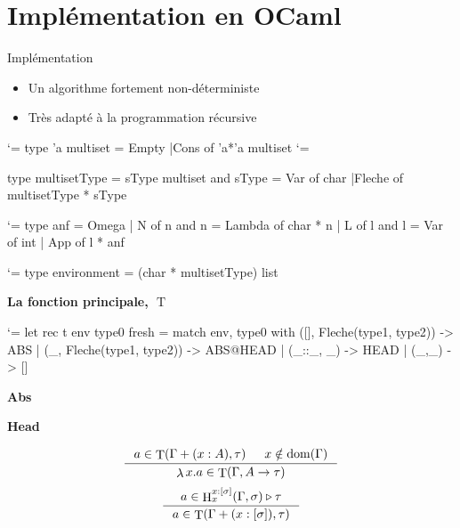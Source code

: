 \documentclass{beamer}
\newcommand\heading[1]{%
  \par\bigskip
  {\Large\bfseries#1}\par\smallskip}
\let\origlstlisting=\lstlisting
\let\endoriglstlisting=\endlstlisting
\renewenvironment{lstlisting}
{\mathcode`\-=\hyphenmathcode
    \everymath{}\mathsurround=0pt\origlstlisting}
{\endoriglstlisting}
\DeclareMathOperator{\iT}{T}
\DeclareMathOperator{\iH}{H}
\DeclareMathOperator{\iDom}{dom}
\DeclareMathOperator{\iLambda}{\lambda}
\begin{document}
    \section{Implémentation en OCaml}
    \begin{frame}[containsverbatim]{Implémentation}
        \begin{itemize}
            \item Un algorithme fortement non-déterministe
            \item Très adapté à la programmation récursive
        \end{itemize}
        
        \begin{multicols}{2}
        \begin{lstlisting}
type 'a multiset =
 Empty
|Cons of 'a*'a multiset
        \end{lstlisting}
\begin{lstlisting} %[caption={Intersection types and environments}]

type multisetType = 
 sType multiset 
and sType = 
 Var of char
|Fleche of multisetType
            * sType
\end{lstlisting}

        \vfill
        \columnbreak
        \begin{lstlisting}
type anf = 
    Omega
  | N of n
and n = 
    Lambda of char * n
  | L of l
and l =
    Var of int
  | App of l * anf
            \end{lstlisting}
            
        \end{multicols}
\begin{lstlisting}
type environment = (char * multisetType) list
\end{lstlisting}
    \end{frame}
    
    \begin{frame}[containsverbatim]
    \heading{La fonction principale, $\iT$}
    \begin{lstlisting}
let rec t env type0 fresh =
  match env, type0 with
      ([], Fleche(type1, type2)) -> ABS
    | (_, Fleche(type1, type2)) -> ABS@HEAD
    | (_::_, _) -> HEAD
    | (_,_) -> []
    \end{lstlisting}
    
    \begin{multicols}{2}
    \heading{Abs}
    \columnbreak
    \heading{Head}
    \end{multicols}
    \begin{multicols}{2}
    \small
    \begin{displaymath}
        \inference[]{a \in \iT(\Gamma + (x : A), \tau) & x \notin \iDom(\Gamma)}{\iLambda x.a \in \iT(\Gamma, A \rightarrow \tau)}
    \end{displaymath}
    \vfill
    \columnbreak
    \begin{displaymath}
        \inference[]{a \in \iH^{x:[\sigma]}_x(\Gamma, \sigma) \triangleright \tau}{a \in\iT(\Gamma + (x:[\sigma]), \tau) }
    \end{displaymath}
        \end{multicols}
        \normalsize
    \end{frame}
    
\end{document}
